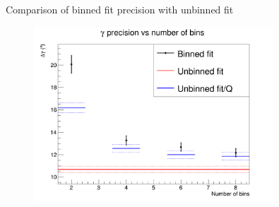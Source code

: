 \documentclass{beamer}
\begin{document}
\begin{frame}{Comparison of binned fit precision with unbinned fit}
  \begin{figure}
    \centering
    \includegraphics[width = 0.8\textwidth]{Plots/GammaPrecisionVersusBinNumber.png}
  \end{figure}
\end{frame}
\end{document}
